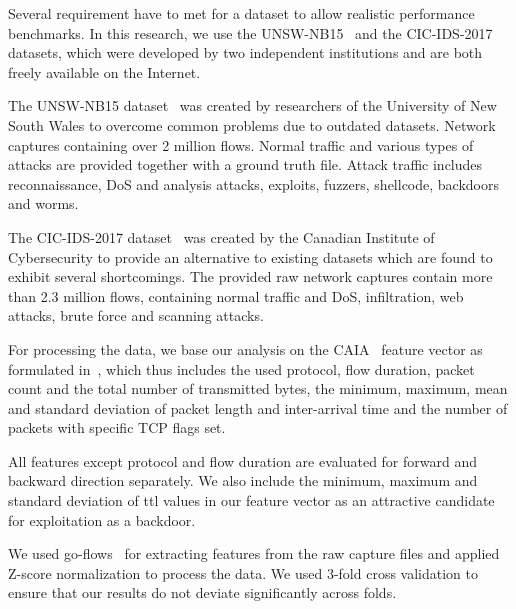 \documentclass[10pt,sigconf,letterpaper,dvipsnames]{acmart}
\newcommand{\unsw}{UNSW-NB15}
\begin{document}
Several requirement have to met for a dataset to allow realistic performance benchmarks. %
In this research, we use the \unsw{}~\cite{moustafa_unsw-nb15:_2015} and the CIC-IDS-2017~\cite{sharafaldin_toward_2018} datasets, which were developed by two independent institutions and are both freely available on the Internet. %

The \unsw{} dataset~\cite{moustafa_unsw-nb15:_2015} was created by researchers of the University of New South Wales to overcome common problems due to outdated datasets. Network captures containing over 2 million flows. Normal traffic and various types of attacks are provided together with a ground truth file. Attack traffic includes reconnaissance, DoS and analysis attacks, exploits, fuzzers,  shellcode, backdoors and worms.

The CIC-IDS-2017 dataset~\cite{sharafaldin_toward_2018} was created by the Canadian Institute of Cybersecurity to provide an alternative to existing datasets which are found to exhibit several shortcomings. The provided raw network captures contain more than 2.3 million flows, containing normal traffic and DoS, infiltration, web attacks, brute force and scanning attacks.

For processing the data, we base our analysis on the CAIA~\cite{williams_preliminary_2006} feature vector as formulated in~\cite{meghdouri_analysis_2018}, which thus includes the used protocol, flow duration, packet count and the total number of transmitted bytes, the minimum, maximum, mean and standard deviation of packet length and inter-arrival time and the number of packets with specific TCP flags set.

All features except protocol and flow duration are evaluated for forward and backward direction separately.
We also include the minimum, maximum and standard deviation of \gls{ttl} values in our feature vector as an attractive candidate for exploitation as a backdoor. %

We used go-flows~\cite{vormayr_cn-tu/go-flows_2019}
for extracting features from the raw capture files and applied Z-score normalization to process the data. We used 3-fold cross validation to ensure that our results do not deviate significantly across folds.
\end{document}
